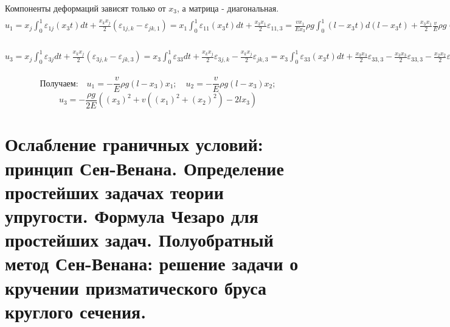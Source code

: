 Компоненты деформаций зависят только от $x_3$, а матрица - диагональная.
$ \displaystyle
u_1=x_j \int_0^1 \varepsilon_{1 j}\left(x_3 t\right) d t+\frac{x_k x_j}{2}\left(\varepsilon_{1 j, k}-\varepsilon_{j k, 1}\right)=x_1 \int_0^1 \varepsilon_{11}\left(x_3 t\right) d t+\frac{x_3 x_1}{2} \varepsilon_{11,3}=\frac{v x_1}{E x_3} \rho g \int_0^1\left(l-x_3 t\right) d\left(l-x_3 t\right)+\frac{x_3 x_1}{2} \frac{v}{E} \rho g=\left.\frac{v x_1}{E} \frac{\rho g}{2 x_3}\left(l-x_3 t\right)^2\right|_0 ^1+\frac{x_3 x_1}{2} \frac{v}{E} \rho g=\frac{v \rho g}{2 E} x_1\left(\frac{\left(l-x_3\right)^2-l^2}{x_3}+x_3\right)=-\frac{v \rho g}{E} x_1\left(l-x_3\right) u_2= x_j \int_0^1 \varepsilon_{2 j} d t+\frac{x_k x_j}{2}\left(\varepsilon_{2 j, k}-\varepsilon_{j k, 2}\right)=x_2 \int_0^1 \varepsilon_{22}\left(x_3 t\right) d t+\frac{x_3 x_2}{2} \varepsilon_{22,3}=\frac{v x_2}{E x_3} \rho g \int_0^1\left(l-x_3 t\right) d\left(l-x_3 t\right)+\frac{x_3 x_2}{2} \frac{v}{E} \rho g=\left.\frac{v x_2}{E x_3} \rho g \frac{\left(l-x_3 t\right)^2}{2}\right|_0 ^1+\frac{x_3 x_2}{2} \frac{v}{E} \rho g=\frac{v \rho g}{2 E} x_2\left(\frac{\left(l-x_3\right)^2-l^2}{x_3}+x_3\right)=-\frac{v \rho g}{E} x_2\left(l-x_3\right)$

$ \displaystyle
u_3=x_j \int_0^1 \varepsilon_{3 j} d t+\frac{x_k x_j}{2}\left(\varepsilon_{3 j, k}-\varepsilon_{j k, 3}\right)=x_3 \int_0^1 \varepsilon_{33} d t+\frac{x_k x_j}{2} \varepsilon_{3 j, k}-\frac{x_k x_j}{2} \varepsilon_{j k, 3}=x_3 \int_0^1 \varepsilon_{33}\left(x_3 t\right) d t+\frac{x_3 x_3}{2} \varepsilon_{33,3}
-\frac{x_3 x_3}{2} \varepsilon_{33,3}-\frac{x_2 x_2}{2} \varepsilon_{22,3}-\frac{x_1 x_1}{2} \varepsilon_{11,3}=-\frac{\rho g}{E} \int_0^1\left(l-x_3 t\right) d\left(-x_3 t\right)-\frac{v \rho g}{2 E}\left[\left(x_2\right)^2+\left(x_1\right)^2\right]
=-\left.\frac{\rho g}{E} \frac{\left(l-x_3 t\right)^2}{2}\right|_0 ^1-\frac{v \rho g}{2 E}\left[\left(x_2\right)^2+\left(x_1\right)^2\right]=-\frac{\rho g}{2 E}\left(\left(x_3\right)^2+v\left[\left(x_2\right)^2+\left(x_1\right)^2\right]-2 l x_3\right)$


$$ \text{Получаем:}\quad u_1=-\frac{v}{E} \rho g\left(l-x_3\right) x_1 ; \quad u_2=-\frac{v}{E} \rho g\left(l-x_3\right) x_2;  $$
$$ u_3=-\frac{\rho g}{2 E}\left(\left(x_3\right)^2+v\left(\left(x_1\right)^2+\left(x_2\right)^2\right)-2 l x_3\right)$$


\vfill

\section{Ослабление граничных условий: принцип Сен-Венана. Определение простейших задачах теории упругости. Формула Чезаро для простейших задач. Полуобратный метод Сен-Венана: решение задачи о кручении призматического бруса круглого сечения.}

